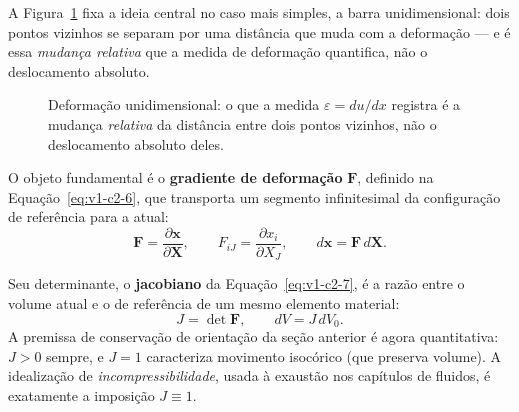 \documentclass[12pt,a4paper]{article}
\numberwithin{equation}{section}
\numberwithin{table}{section}
\numberwithin{figure}{section}
\begin{document}
A Figura~\ref{fig:v1-c2-1} fixa a ideia central no caso mais simples, a barra
unidimensional: dois pontos vizinhos se separam por uma distância que muda
com a deformação --- e é essa \emph{mudança relativa} que a medida de
deformação quantifica, não o deslocamento absoluto.

\begin{figure}[H]
\centering
{}
\caption[Deformação unidimensional como mudança relativa de distância.]{%
Deformação unidimensional: o que a medida $\varepsilon = du/dx$ registra é a
mudança \emph{relativa} da distância entre dois pontos vizinhos, não o
deslocamento absoluto deles.}
\label{fig:v1-c2-1}
\end{figure}


O objeto fundamental é o \textbf{gradiente de deformação} $\mathbf{F}$,
definido na Equação~\eqref{eq:v1-c2-6}, que transporta um segmento
infinitesimal da configuração de referência para a atual:
\begin{equation}\label{eq:v1-c2-6}
\mathbf{F} = \frac{\partial \mathbf{x}}{\partial \mathbf{X}},
\qquad F_{iJ} = \frac{\partial x_i}{\partial X_J},
\qquad d\mathbf{x} = \mathbf{F}\,d\mathbf{X}.
\end{equation}

Seu determinante, o \textbf{jacobiano} da Equação~\eqref{eq:v1-c2-7}, é a razão
entre o volume atual e o de referência de um mesmo elemento material:
\begin{equation}\label{eq:v1-c2-7}
J = \det \mathbf{F}, \qquad dV = J\,dV_0.
\end{equation}
A premissa de conservação de orientação da seção anterior é agora quantitativa:
$J>0$ sempre, e $J=1$ caracteriza movimento isocórico (que preserva volume).
A idealização de \emph{incompressibilidade}, usada à exaustão nos capítulos de
fluidos, é exatamente a imposição $J \equiv 1$.
\end{document}

